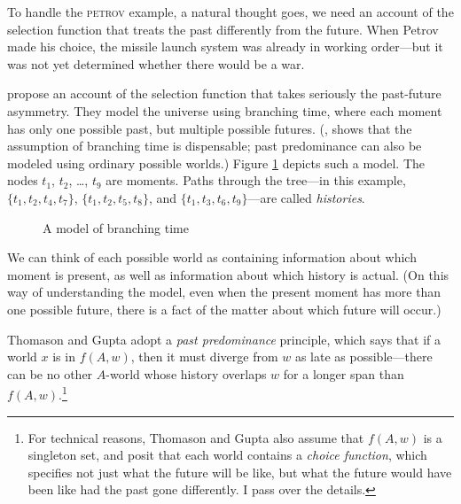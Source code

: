 To handle the \textsc{petrov} example, a natural thought goes, we need an account of the selection function that treats the past differently from the future. When Petrov made his choice, the missile launch system was already in working order---but it was not yet determined whether there would be a war.

\citet{Thomason1980-THOATO-4} propose an account of the selection function that takes seriously the past-future asymmetry.  They model the universe using branching time, where each moment has only one possible past, but multiple possible futures.  (\citealp{Cross1990-CROTNA}, shows that the assumption of branching time is dispensable; past predominance can also be modeled using ordinary possible worlds.)  Figure \ref{fig-branching-time} depicts such a model. The nodes $t_1$, $t_2$, \ldots, $t_9$ are moments.  Paths through the tree---in this example, $\{t_1, t_2, t_4, t_7\}$, $\{t_1, t_2, t_5, t_8\}$, and $\{t_1, t_3, t_6, t_9\}$---are called \emph{histories}.

\begin{figure}
\centering
{}
\caption{A model of branching time}
\label{fig-branching-time}
\end{figure}

We can think of each possible world as containing information about which moment is present, as well as information about which history is actual.  (On this way of understanding the model, even when the present moment has more than one possible future, there is a fact of the matter about which future will occur.)

Thomason and Gupta adopt a \emph{past predominance} principle, which says that if a world $x$ is in $f(A, w)$, then it must diverge from $w$ as late as possible---there can be no other $A$-world whose history overlaps $w$ for a longer span than $f(A, w)$.\footnote{For technical reasons, Thomason and Gupta also assume that $f(A, w)$ is a singleton set, and posit that each world contains a \emph{choice function}, which specifies not just what the future will be like, but what the future would have been like had the past gone differently.  I pass over the details.}

